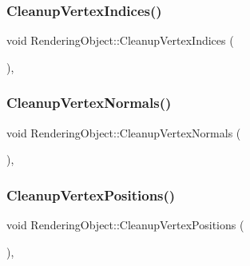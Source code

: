\hypertarget{class_rendering_object_ac60c8a7f3d5678fd4aa8198f6c980e6e}{}\label{class_rendering_object_ac60c8a7f3d5678fd4aa8198f6c980e6e} 
\subsubsection{\texorpdfstring{Cleanup\+Vertex\+Indices()}{CleanupVertexIndices()}}
{\footnotesize\ttfamily void Rendering\+Object\+::\+Cleanup\+Vertex\+Indices (\begin{DoxyParamCaption}{ }\end{DoxyParamCaption})\hspace{0.3cm}{\ttfamily [protected]}, {\ttfamily [virtual]}}

\hypertarget{class_rendering_object_ad89bc24893f8fe32794f0686c2bb0da1}{}\label{class_rendering_object_ad89bc24893f8fe32794f0686c2bb0da1} 
\subsubsection{\texorpdfstring{Cleanup\+Vertex\+Normals()}{CleanupVertexNormals()}}
{\footnotesize\ttfamily void Rendering\+Object\+::\+Cleanup\+Vertex\+Normals (\begin{DoxyParamCaption}{ }\end{DoxyParamCaption})\hspace{0.3cm}{\ttfamily [protected]}, {\ttfamily [virtual]}}

\hypertarget{class_rendering_object_af9c1a07398071cdd0cca3ad36095fc85}{}\label{class_rendering_object_af9c1a07398071cdd0cca3ad36095fc85} 
\subsubsection{\texorpdfstring{Cleanup\+Vertex\+Positions()}{CleanupVertexPositions()}}
{\footnotesize\ttfamily void Rendering\+Object\+::\+Cleanup\+Vertex\+Positions (\begin{DoxyParamCaption}{ }\end{DoxyParamCaption})\hspace{0.3cm}{\ttfamily [protected]}, {\ttfamily [virtual]}}

